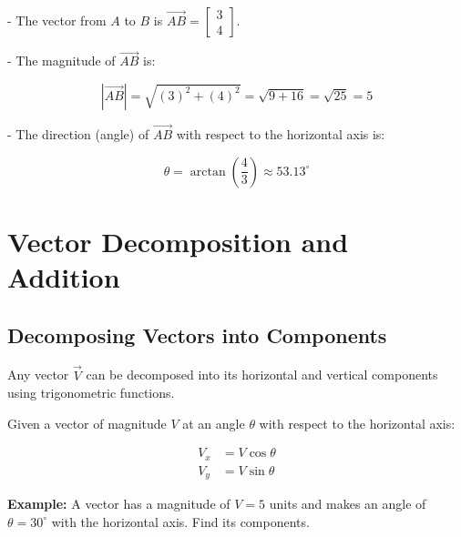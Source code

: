 \documentclass{article}
\begin{document}
\begin{multicols}{2}
- The vector from \( A \) to \( B \) is \( \vec{AB} = \begin{bmatrix} 3 \\ 4 \end{bmatrix} \).

- The magnitude of \( \vec{AB} \) is:

  \[
  |\vec{AB}| = \sqrt{(3)^2 + (4)^2} = \sqrt{9 + 16} = \sqrt{25} = 5
  \]

- The direction (angle) of \( \vec{AB} \) with respect to the horizontal axis is:

  \[
  \theta = \arctan\left( \dfrac{4}{3} \right) \approx 53.13^\circ
  \]

\section*{Vector Decomposition and Addition}

\subsection*{Decomposing Vectors into Components}

Any vector \(\vec{V}\) can be decomposed into its horizontal and vertical components using trigonometric functions.

Given a vector of magnitude \( V \) at an angle \( \theta \) with respect to the horizontal axis:

\[
\begin{aligned}
V_x &= V \cos \theta \\
V_y &= V \sin \theta
\end{aligned}
\]

\begin{center}
\end{center}

\textbf{Example:} A vector has a magnitude of \( V = 5 \) units and makes an angle of \( \theta = 30^\circ \) with the horizontal axis. Find its components.


\end{multicols}
\end{document}
